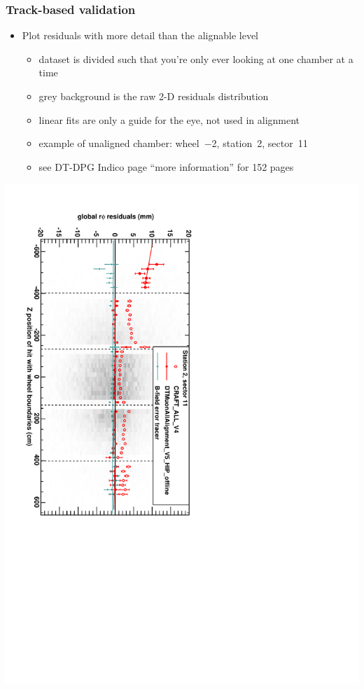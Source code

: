 \documentclass[compress]{beamer}
\begin{document}
\begin{frame}
\frametitle{Track-based validation}

\begin{itemize}
\item Plot residuals with more detail than the alignable level
\begin{itemize}
\item dataset is divided such that you're only ever looking at one chamber at a time
\item grey background is the raw 2-D residuals distribution
\item linear fits are only a guide for the eye, not used in alignment
\item example of unaligned chamber: wheel~$-$2, station~2, sector~11
\item see DT-DPG Indico page ``more information'' for 152 pages
\end{itemize}
\end{itemize}

\vspace{-0.4 cm}
\begin{center}
\includegraphics[height=0.95\linewidth, angle=90]{summary_DTrphiVsZ_st2_sr11.pdf}
\end{center}
\end{frame}
\end{document}
